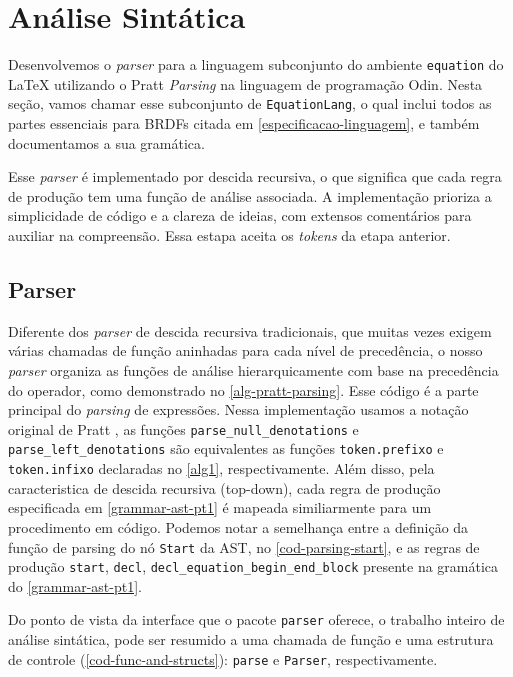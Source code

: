 
\section{Análise Sintática}

Desenvolvemos o \textit{parser} para a linguagem subconjunto do ambiente \verb"equation" do \LaTeX{} utilizando o Pratt \textit{Parsing} na linguagem de programação Odin. Nesta seção, vamos chamar esse subconjunto de \texttt{EquationLang}, o qual inclui todos as partes essenciais para BRDFs citada em \autoref{especificacao-linguagem}, e também documentamos a sua gramática.

Esse \textit{parser} é implementado por descida recursiva, o que significa que cada regra de produção tem uma função de análise associada. A implementação prioriza a simplicidade de código e a clareza de ideias, com extensos comentários para auxiliar na compreensão. Essa estapa aceita os \textit{tokens} da etapa anterior.


\subsection{Parser}


Diferente dos \textit{parser} de descida recursiva tradicionais, que muitas vezes exigem várias chamadas de função aninhadas para cada nível de precedência, o nosso \textit{parser} organiza as funções de análise hierarquicamente com base na precedência do operador, como demonstrado no \autoref{alg-pratt-parsing}. Esse código é a parte principal do \textit{parsing} de expressões. Nessa implementação usamos a notação original de Pratt \cite{pratt}, as funções \texttt{parse\_null\_denotations} e \texttt{parse\_left\_denotations} são equivalentes as funções \texttt{token.prefixo} e \texttt{token.infixo} declaradas no \autoref{alg1}, respectivamente.
Além disso, pela caracteristica de descida recursiva (top-down), cada regra de produção especificada em \autoref{grammar-ast-pt1} é mapeada similiarmente para um procedimento em código. Podemos notar a semelhança entre a definição da função de parsing do nó \texttt{Start} da AST, no \autoref{cod-parsing-start}, e as regras de produção \texttt{start}, \texttt{decl}, \texttt{decl\_equation\_begin\_end\_block} presente na gramática do \autoref{grammar-ast-pt1}.

Do ponto de vista da interface que o pacote \texttt{parser} oferece, o trabalho inteiro de análise sintática,  pode ser resumido a uma chamada de função e uma estrutura de controle (\autoref{cod-func-and-structs}): \texttt{parse} e \texttt{Parser}, respectivamente.




